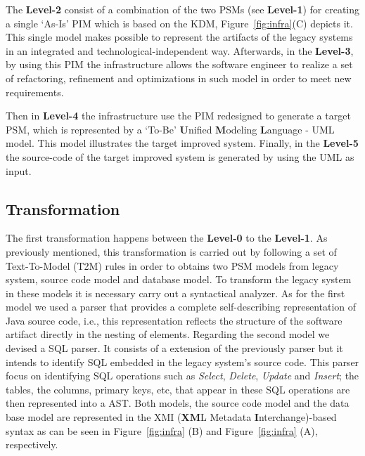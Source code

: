The \textbf{Level-2} consist of a combination of the two PSMs (see \textbf{Level-1}) for creating a single `As-Is' PIM which is based on the KDM, Figure~\ref{fig:infra}(C) depicts it. This single model makes possible to represent the artifacts of the legacy systems in an integrated and technological-independent way. %
Afterwards, in the \textbf{Level-3}, by using this PIM the infrastructure allows the software engineer to realize a set of refactoring, refinement and optimizations in such model in order to meet new requirements. %

Then in \textbf{Level-4} the infrastructure use the PIM redesigned to generate a target PSM, which is represented by a `To-Be' \textbf{U}nified \textbf{M}odeling \textbf{L}anguage - UML model. This model illustrates the target improved system. Finally, in the \textbf{Level-5} the source-code of the target improved system is generated by using the UML as input.

\subsection{Transformation}\label{subsection:transformation}

The first transformation happens between the \textbf{Level-0} to the \textbf{Level-1}. As previously mentioned, this transformation is carried out by following a set of Text-To-Model (T2M) rules in order to obtains two PSM models from legacy system, source code model and database model. To transform the legacy system in these models it is necessary carry out a syntactical analyzer. As for the first model we used a parser that provides a complete self-describing representation of Java source code, i.e., this representation reflects the structure of the software artifact directly in the nesting of elements. Regarding the second model we devised a SQL parser. It consists of a extension of the previously parser but it intends to identify SQL embedded in the legacy system's source code. This parser focus on identifying SQL operations such as \textit{Select}, \textit{Delete}, \textit{Update} and \textit{Insert}; the tables, the columns, primary keys, etc, that appear in these SQL operations are then represented into a AST. Both models, the source code model and the data base model  are represented in the XMI (\textbf{XM}L Metadata \textbf{I}nterchange)-based syntax as can be seen in Figure~\ref{fig:infra} (B) and Figure~\ref{fig:infra} (A), respectively. 

